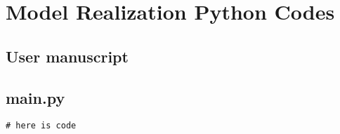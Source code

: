 \chapter{Model Realization Python Codes}
\label{app:code}


\section{User manuscript}


\newpage
\begin{spacing}{1.2}
\section{main.py}
\label{sec:code:main}
\begin{lstlisting}
# here is code
\end{lstlisting}
\end{spacing}
